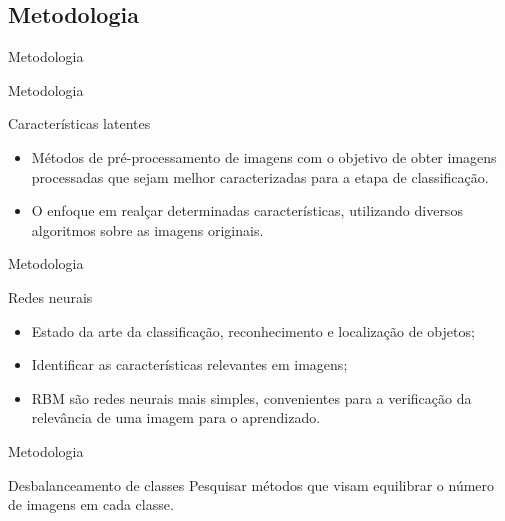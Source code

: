 \documentclass{beamer}
\begin{document}
\subsection{Metodologia}
\begin{frame}{Metodologia}
\end{frame}
\begin{frame}{Metodologia}
\begin{block}{Características latentes}
\justifying
\begin{itemize}
\item Métodos de pré-processamento de imagens com o objetivo de obter imagens processadas que sejam melhor caracterizadas para a etapa de classificação. 
\item O enfoque em realçar determinadas características, utilizando diversos algoritmos sobre as imagens originais.
\end{itemize}
\end{block}
\end{frame}
\begin{frame}{Metodologia}
\begin{block}{Redes neurais}
\justifying
\begin{itemize}
\item Estado da arte da classificação, reconhecimento e localização de objetos;
\item Identificar as características relevantes em imagens;
\item RBM são redes neurais mais simples, convenientes para a verificação da relevância de uma imagem para o aprendizado.
\end{itemize}
\end{block}
\end{frame}
\begin{frame}{Metodologia}
\begin{block}{Desbalanceamento de classes}
\justifying
Pesquisar métodos que visam equilibrar o número de imagens em cada classe.
\end{block}
\end{frame}
\end{document}
